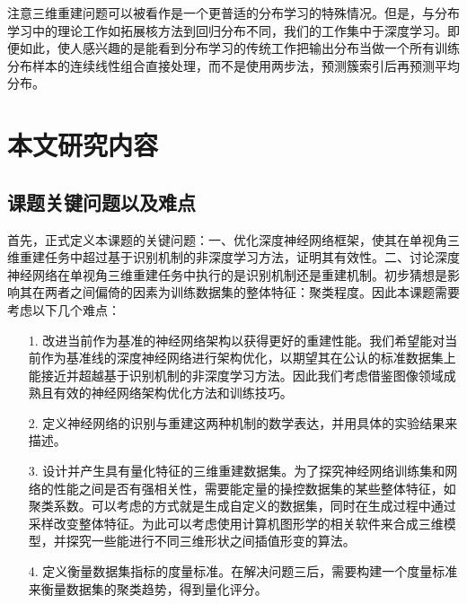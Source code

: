 \documentclass[bachelor, nocolorlinks, printoneside]{seuthesis} %
\begin{document}
\begin{Main}
注意三维重建问题可以被看作是一个更普适的分布学习\cite{oliva2013distribution,poczos2013distribution}的特殊情况。但是，与分布学习中的理论工作如拓展核方法到回归分布不同，我们的工作集中于深度学习。即便如此，使人感兴趣的是能看到分布学习的传统工作把输出分布当做一个所有训练分布样本的连续线性组合直接处理，而不是使用两步法，预测簇索引后再预测平均分布。
\section{本文研究内容}
\subsection{课题关键问题以及难点}\label{sec:core_prob}
首先，正式定义本课题的关键问题：一、优化深度神经网络框架，使其在单视角三维重建任务中超过基于识别机制的非深度学习方法，证明其有效性。二、讨论深度神经网络在单视角三维重建任务中执行的是识别机制还是重建机制。初步猜想是影响其在两者之间偏倚的因素为训练数据集的整体特征：聚类程度。因此本课题需要考虑以下几个难点：
\begin{enumerate}
    \item[1.]改进当前作为基准的神经网络架构以获得更好的重建性能。我们希望能对当前作为基准线的深度神经网络进行架构优化，以期望其在公认的标准数据集上能接近并超越基于识别机制的非深度学习方法。因此我们考虑借鉴图像领域成熟且有效的神经网络架构优化方法和训练技巧。
    \item[2.]定义神经网络的识别与重建这两种机制的数学表达，并用具体的实验结果来描述。
    \item[3.]设计并产生具有量化特征的三维重建数据集。为了探究神经网络训练集和网络的性能之间是否有强相关性，需要能定量的操控数据集的某些整体特征，如聚类系数。可以考虑的方式就是生成自定义的数据集，同时在生成过程中通过采样改变整体特征。为此可以考虑使用计算机图形学的相关软件来合成三维模型，并探究一些能进行不同三维形状之间插值形变的算法。
    \item[4.]定义衡量数据集指标的度量标准。在解决问题三后，需要构建一个度量标准来衡量数据集的聚类趋势，得到量化评分。   
\end{enumerate}


\end{Main}
\end{document}
